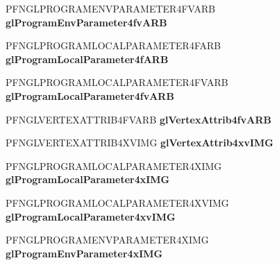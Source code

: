 \begin{DoxyCompactItemize}
\item 
\hypertarget{class_c_p_v_r_tgles_ext_aea6296b4bec77686d8100ddeb274e5b4}{P\+F\+N\+G\+L\+P\+R\+O\+G\+R\+A\+M\+E\+N\+V\+P\+A\+R\+A\+M\+E\+T\+E\+R4\+F\+V\+A\+R\+B {\bfseries gl\+Program\+Env\+Parameter4fv\+A\+R\+B}}\label{class_c_p_v_r_tgles_ext_aea6296b4bec77686d8100ddeb274e5b4}

\item 
\hypertarget{class_c_p_v_r_tgles_ext_a42601f56378b8ce2c9a07681816e11a7}{P\+F\+N\+G\+L\+P\+R\+O\+G\+R\+A\+M\+L\+O\+C\+A\+L\+P\+A\+R\+A\+M\+E\+T\+E\+R4\+F\+A\+R\+B {\bfseries gl\+Program\+Local\+Parameter4f\+A\+R\+B}}\label{class_c_p_v_r_tgles_ext_a42601f56378b8ce2c9a07681816e11a7}

\item 
\hypertarget{class_c_p_v_r_tgles_ext_aa34422e30a9bad9bba8f11696820ba57}{P\+F\+N\+G\+L\+P\+R\+O\+G\+R\+A\+M\+L\+O\+C\+A\+L\+P\+A\+R\+A\+M\+E\+T\+E\+R4\+F\+V\+A\+R\+B {\bfseries gl\+Program\+Local\+Parameter4fv\+A\+R\+B}}\label{class_c_p_v_r_tgles_ext_aa34422e30a9bad9bba8f11696820ba57}

\item 
\hypertarget{class_c_p_v_r_tgles_ext_afd27403bdb65212be79f2e5935c40662}{P\+F\+N\+G\+L\+V\+E\+R\+T\+E\+X\+A\+T\+T\+R\+I\+B4\+F\+V\+A\+R\+B {\bfseries gl\+Vertex\+Attrib4fv\+A\+R\+B}}\label{class_c_p_v_r_tgles_ext_afd27403bdb65212be79f2e5935c40662}

\item 
\hypertarget{class_c_p_v_r_tgles_ext_ae30da17ecd97d50fc3779b55fd6a16e0}{P\+F\+N\+G\+L\+V\+E\+R\+T\+E\+X\+A\+T\+T\+R\+I\+B4\+X\+V\+I\+M\+G {\bfseries gl\+Vertex\+Attrib4xv\+I\+M\+G}}\label{class_c_p_v_r_tgles_ext_ae30da17ecd97d50fc3779b55fd6a16e0}

\item 
\hypertarget{class_c_p_v_r_tgles_ext_a2ac2d89a62e51e83476a8cd51d1ab479}{P\+F\+N\+G\+L\+P\+R\+O\+G\+R\+A\+M\+L\+O\+C\+A\+L\+P\+A\+R\+A\+M\+E\+T\+E\+R4\+X\+I\+M\+G {\bfseries gl\+Program\+Local\+Parameter4x\+I\+M\+G}}\label{class_c_p_v_r_tgles_ext_a2ac2d89a62e51e83476a8cd51d1ab479}

\item 
\hypertarget{class_c_p_v_r_tgles_ext_a8cce09c4d993de73e58a96ecb9b0c63f}{P\+F\+N\+G\+L\+P\+R\+O\+G\+R\+A\+M\+L\+O\+C\+A\+L\+P\+A\+R\+A\+M\+E\+T\+E\+R4\+X\+V\+I\+M\+G {\bfseries gl\+Program\+Local\+Parameter4xv\+I\+M\+G}}\label{class_c_p_v_r_tgles_ext_a8cce09c4d993de73e58a96ecb9b0c63f}

\item 
\hypertarget{class_c_p_v_r_tgles_ext_a18120633a0ffc0ac37232c44a204d90b}{P\+F\+N\+G\+L\+P\+R\+O\+G\+R\+A\+M\+E\+N\+V\+P\+A\+R\+A\+M\+E\+T\+E\+R4\+X\+I\+M\+G {\bfseries gl\+Program\+Env\+Parameter4x\+I\+M\+G}}\label{class_c_p_v_r_tgles_ext_a18120633a0ffc0ac37232c44a204d90b}


\end{DoxyCompactItemize}
